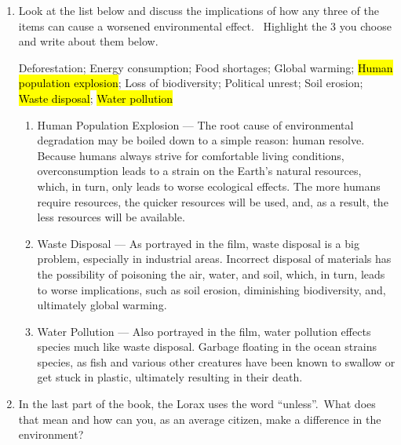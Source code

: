 \documentclass[12pt]{article}
\begin{document}
\begin{enumerate}
\begin{justify}
    \end{justify}

  \item Look at the list below and discuss the implications of how any three of the items can cause a worsened environmental effect.  Highlight the 3 you choose and write about them below.

    \begin{center}

      Deforestation; Energy consumption; Food shortages; Global warming; \hl{Human population explosion}; Loss of biodiversity; Political unrest; Soil erosion; \hl{Waste disposal}; \hl{Water pollution} 

    \end{center}

    \begin{enumerate}

      \item Human Population Explosion — The root cause of environmental degradation may be boiled down to a simple reason: human resolve. Because humans always strive for comfortable living conditions, overconsumption leads to a strain on the Earth's natural resources, which, in turn, only leads to worse ecological effects. The more humans require resources, the quicker resources will be used, and, as a result, the less resources will be available.

      \item Waste Disposal — As portrayed in the film, waste disposal is a big problem, especially in industrial areas. Incorrect disposal of materials has the possibility of poisoning the air, water, and soil, which, in turn, leads to worse implications, such as soil erosion, diminishing biodiversity, and, ultimately global warming.

      \item Water Pollution — Also portrayed in the film, water pollution effects species much like waste disposal. Garbage floating in the ocean strains species, as fish and various other creatures have been known to swallow or get stuck in plastic, ultimately resulting in their death.

    \end{enumerate}

  \item In the last part of the book, the Lorax uses the word “unless”. What does that mean and how can you, as an average citizen, make a difference in the environment?

    \begin{justify}


\end{justify}
\end{enumerate}
\end{document}
